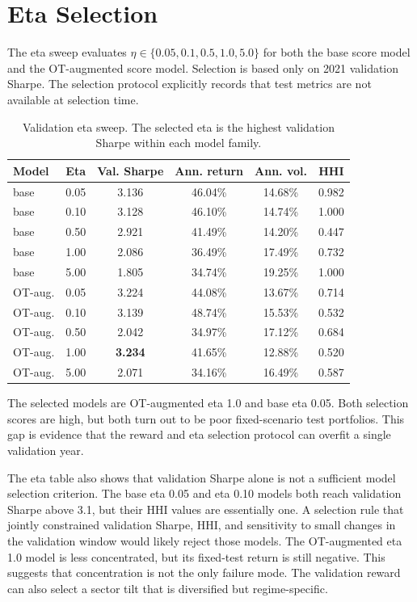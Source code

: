 \documentclass{article}
\begin{document}
\section{Eta Selection}

The eta sweep evaluates $\eta\in\{0.05,0.1,0.5,1.0,5.0\}$ for both the base score
model and the OT-augmented score model. Selection is based only on 2021
validation Sharpe. The selection protocol explicitly records that test metrics
are not available at selection time.

\begin{table}[t]
\centering
\caption{Validation eta sweep. The selected eta is the highest validation Sharpe
within each model family.}
\label{tab:eta}
\begin{tabular}{llcccc}
\toprule
Model & Eta & Val. Sharpe & Ann. return & Ann. vol. & HHI \\
\midrule
base & 0.05 & 3.136 & 46.04\% & 14.68\% & 0.982 \\
base & 0.10 & 3.128 & 46.10\% & 14.74\% & 1.000 \\
base & 0.50 & 2.921 & 41.49\% & 14.20\% & 0.447 \\
base & 1.00 & 2.086 & 36.49\% & 17.49\% & 0.732 \\
base & 5.00 & 1.805 & 34.74\% & 19.25\% & 1.000 \\
\midrule
OT-aug. & 0.05 & 3.224 & 44.08\% & 13.67\% & 0.714 \\
OT-aug. & 0.10 & 3.139 & 48.74\% & 15.53\% & 0.532 \\
OT-aug. & 0.50 & 2.042 & 34.97\% & 17.12\% & 0.684 \\
OT-aug. & 1.00 & \textbf{3.234} & 41.65\% & 12.88\% & 0.520 \\
OT-aug. & 5.00 & 2.071 & 34.16\% & 16.49\% & 0.587 \\
\bottomrule
\end{tabular}
\end{table}

The selected models are OT-augmented eta 1.0 and base eta 0.05. Both selection
scores are high, but both turn out to be poor fixed-scenario test portfolios.
This gap is evidence that the reward and eta selection protocol can overfit a
single validation year.

The eta table also shows that validation Sharpe alone is not a sufficient model
selection criterion. The base eta 0.05 and eta 0.10 models both reach validation
Sharpe above 3.1, but their HHI values are essentially one. A selection rule that
jointly constrained validation Sharpe, HHI, and sensitivity to small changes in
the validation window would likely reject those models. The OT-augmented eta 1.0
model is less concentrated, but its fixed-test return is still negative. This
suggests that concentration is not the only failure mode. The validation reward
can also select a sector tilt that is diversified but regime-specific.
\end{document}
